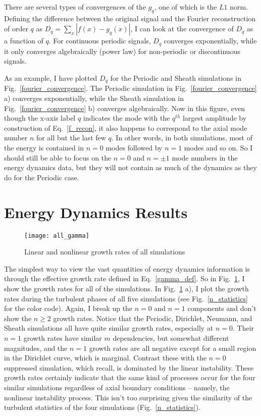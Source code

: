 There are several types of convergences of the $g_q$, one of which is the $L1$ norm. Defining the difference between the original signal and the Fourier reconstruction of order $q$ as
$D_q = \sum_x |f(x) - g_q(x)|$, I can look at the convergence of $D_q$ as a function of $q$. For continuous periodic signals, $D_q$ converges exponentially, while it only converges algebraically
(power law) for non-periodic or discontinuous signals. 

As an example, I have plotted $D_q$ for the Periodic and Sheath simulations in Fig.~\ref{fourier_convergence}. The Periodic simulation in Fig.~\ref{fourier_convergence} a) converges exponentially,
while the Sheath simulation in Fig.~\ref{fourier_convergence} b) converges algebraically. Now in this figure, even though the x-axis label $q$ indicates the mode with the $q^{th}$ largest amplitude
by construction of Eq.~\ref{f_recon}, it also happens to correspond to the axial mode number $n$ for all but the last few $q$. In other words, in both simulations, most of the energy is contained
in $n=0$ modes followed by $n=1$ modes and so on. So I should still be able to focus on the $n=0$ and $n = \pm 1$ mode numbers in the energy dynamics data, but they will not contain as much
of the dynamics as they do for the Periodic case.



\section{Energy Dynamics Results}
\label{s_nonper_en_dyn}

\begin{figure}[!ht]
\centerline{\texttt{[image: all\_gamma]}}
\caption{Linear and nonlinear growth rates of all simulations}
\label{all_gamma}
\end{figure}

The simplest way to view the vast quantities of energy dynamics information is through the effective growth rate defined in Eq.~\ref{gamma_def}. So in Fig.~\ref{all_gamma}, I show the growth
rates for all of the simulations. In Fig.~\ref{all_gamma} a), I plot the growth rates during the turbulent phases of all five simulations (see Fig.~\ref{n_statistics} for the color code).
Again, I break up the $n=0$ and $n=1$ components and don't show the $n \ge 2$ growth rates. Notice that the Periodic, Dirichlet, Neumann, and Sheath simulations all have quite similar growth
rates, especially at $n=0$. Their $n=1$ growth rates have similar $m$ dependencies, but somewhat different magnitudes, and the $n=1$ growth rates are all negative except for a small region
in the Dirichlet curve, which is marginal. Contrast these with the $n=0$ suppressed simulation, which recall, is dominated by the linear instability. These growth rates certainly indicate
that the same kind of processes occur for the four similar simulations regardless of axial boundary conditions -- namely, the nonlinear instability process. This isn't too surprising given
the similarity of the turbulent statistics of the four simulations (Fig.~\ref{n_statistics}).

